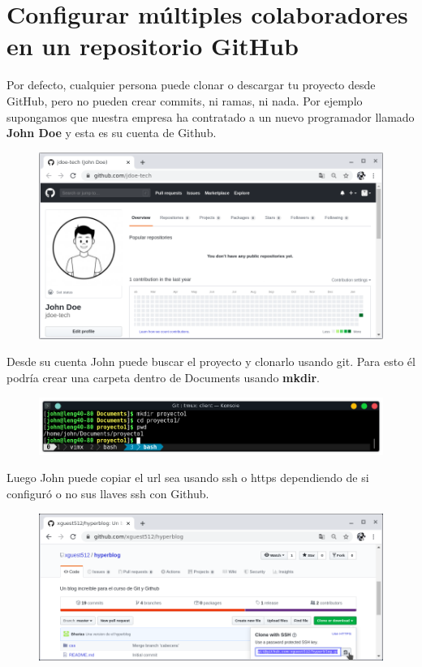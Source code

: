 \documentclass{article}
\begin{document}
\section{Configurar múltiples colaboradores en un repositorio GitHub}%
Por defecto, cualquier persona puede clonar o descargar tu proyecto desde
GitHub, pero no pueden crear commits, ni ramas, ni nada.  Por ejemplo
supongamos que nuestra empresa ha contratado a un nuevo programador llamado
\textbf{John Doe} y esta es su cuenta de Github.

\begin{figure}[h!]
  \centering
  \includegraphics[scale=0.75]{./Pictures/257_jdoe_platzi.png}
\end{figure}

Desde su cuenta John puede buscar el proyecto y clonarlo usando git. Para esto
él podría crear una carpeta dentro de Documents usando \textbf{mkdir}.

\begin{figure}[h!]
  \centering
  \includegraphics[scale=0.75]{./Pictures/258_jdoe_proyecto.png}
\end{figure}

Luego John puede copiar el url sea usando ssh o https dependiendo de si
configuró o no sus llaves ssh con Github.

\begin{figure}[h!]
  \centering
  \includegraphics[scale=0.75]{./Pictures/259_clone_repository.png}
\end{figure}
\end{document}

